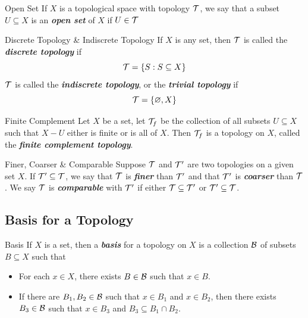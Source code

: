 \documentclass[12pt,a4paper]{article}
\begin{document}
    \begin{defi}{Open Set}
        If $X$ is a topological space with topology $\mathcal{T}$, we say that a subset $U\subseteq X$ is an \textit{\textbf{open set}} of $X$ if $U\in\mathcal{T}$
    \end{defi}
    \hfill

    \begin{defi}{Discrete Topology \& Indiscrete Topology}
        If $X$ is any set, then $\mathcal{T}$ is called the \textit{\textbf{discrete topology}} if 
        $$
        \mathcal{T}=\left\{S:S\subseteq X\right\}
        $$
        $\mathcal{T}$ is called the \textit{\textbf{indiscrete topology}}, or the \textit{\textbf{trivial topology}} if
        $$
        \mathcal{T}=\left\{\varnothing,X\right\}
        $$
    \end{defi}
    \hfill

    \begin{defi}{Finite Complement}
        Let $X$ be a set, let $\mathcal{T}_f$ be the collection of all subsets $U\subseteq X$ such that $X-U$ either is finite or is all of $X$. Then $\mathcal{T}_f$ is a topology on $X$, called the \textit{\textbf{finite complement topology}}.
    \end{defi}
    \hfill

    \begin{defi}{Finer, Coarser \& Comparable}
        Suppose $\mathcal{T}$ and $\mathcal{T}'$ are two topologies on a given set $X$. If $\mathcal{T}'\subseteq \mathcal{T}$, we say that $\mathcal{T}$ is \textit{\textbf{finer}} than $\mathcal{T}'$ and that $\mathcal{T}'$ is \textit{\textbf{coarser}} than $\mathcal{T}$. We say $\mathcal{T}$ is \textit{\textbf{comparable}} with $\mathcal{T}'$ if either $\mathcal{T}\subseteq\mathcal{T}'$ or $\mathcal{T}'\subseteq\mathcal{T}$.
    \end{defi}
    \hfill

    \subsection{Basis for a Topology}
    \begin{defi}{Basis}\addelement{$\B$}
        If $X$ is a set, then a \textit{\textbf{basis}} for a topology on $X$ is a collection $\B$ of subsets $B\subseteq X$ such that
        \begin{itemize}
            \item For each $x\in X$, there exists $B\in\mathcal{B}$ such that $x\in B$.
            \item If there are $B_1,B_2\in \mathcal{B}$ such that $x\in B_1$ and $x\in B_2$, then there exists $B_3\in \mathcal{B}$ such that $x\in B_3$ and $B_3\subseteq B_1\cap B_2$.
        \end{itemize}
    \end{defi}
    \hfill
\end{document}
